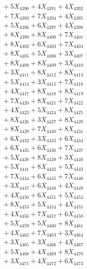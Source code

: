 \documentclass[a4paper,10pt]{article}
\begin{document}
{\begin{align}
&\;  + 5 X_{4390} + 4 X_{4391} + 4 X_{4392} \\[0.3ex]
&\;  + 7 X_{4393} + 7 X_{4394} + 4 X_{4395} \\[0.3ex]
&\;  + 5 X_{4396} + 6 X_{4397} + 4 X_{4398} \\[0.3ex]
&\;  + 8 X_{4399} + 8 X_{4400} + 7 X_{4401} \\[0.3ex]
&\;  + 8 X_{4402} + 6 X_{4403} + 7 X_{4404} \\[0.3ex]
&\;  + 8 X_{4405} + 5 X_{4406} + 3 X_{4407} \\[0.3ex]
&\;  + 8 X_{4408} + 8 X_{4409} + 3 X_{4410} \\[0.3ex]
&\;  + 3 X_{4411} + 8 X_{4412} + 8 X_{4413} \\[0.3ex]
&\;  + 5 X_{4414} + 3 X_{4415} + 7 X_{4416} \\[0.3ex]
&\;  + 4 X_{4417} + 8 X_{4418} + 8 X_{4419} \\[0.5ex]\allowbreak
&\;  + 7 X_{4420} + 8 X_{4421} + 7 X_{4422} \\[0.3ex]
&\;  + 4 X_{4423} + 5 X_{4424} + 8 X_{4425} \\[0.3ex]
&\;  + 8 X_{4426} + 3 X_{4427} + 8 X_{4428} \\[0.3ex]
&\;  + 8 X_{4429} + 7 X_{4430} + 8 X_{4431} \\[0.3ex]
&\;  + 6 X_{4432} + 3 X_{4433} + 6 X_{4434} \\[0.3ex]
&\;  + 6 X_{4435} + 6 X_{4436} + 7 X_{4437} \\[0.3ex]
&\;  + 5 X_{4438} + 8 X_{4439} + 3 X_{4440} \\[0.3ex]
&\;  + 5 X_{4441} + 8 X_{4442} + 5 X_{4443} \\[0.3ex]
&\;  + 7 X_{4444} + 6 X_{4445} + 7 X_{4446} \\[0.3ex]
&\;  + 3 X_{4447} + 6 X_{4448} + 4 X_{4449} \\[0.5ex]\allowbreak
&\;  + 4 X_{4450} + 6 X_{4451} + 5 X_{4452} \\[0.3ex]
&\;  + 8 X_{4453} + 5 X_{4454} + 4 X_{4455} \\[0.3ex]
&\;  + 4 X_{4456} + 7 X_{4457} + 6 X_{4458} \\[0.3ex]
&\;  + 5 X_{4459} + 5 X_{4460} + 8 X_{4461} \\[0.3ex]
&\;  + 4 X_{4462} + 7 X_{4463} + 3 X_{4464} \\[0.3ex]
&\;  + 3 X_{4465} + 3 X_{4466} + 4 X_{4467} \\[0.3ex]
&\;  + 5 X_{4468} + 4 X_{4469} + 8 X_{4470} \\[0.3ex]
&\;  + 3 X_{4471} + 4 X_{4472} + 6 X_{4473} \\[0.3ex]

\end{align}}
\end{document}
